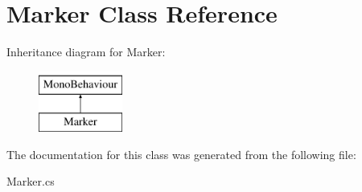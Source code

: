 \hypertarget{class_marker}{\section{Marker Class Reference}
\label{class_marker}
}
Inheritance diagram for Marker\+:\begin{figure}[H]
\begin{center}
\leavevmode
\includegraphics[height=2.000000cm]{class_marker}
\end{center}
\end{figure}


The documentation for this class was generated from the following file\+:\begin{DoxyCompactItemize}
\item 
Marker.\+cs\end{DoxyCompactItemize}
